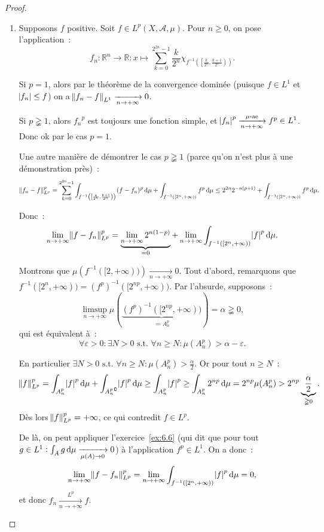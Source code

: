 \documentclass{article}
\theoremstyle{definition}
\newcommand{\pinfty}{{+\infty}}
\newcommand{\st}{\text{ s.t. }}
\newcommand{\C}{\complement}
\newcommand{\R}{{\mathbb R}}
\begin{document}
\begin{proof}~
\begin{enumerate}
	\item Supposons $f$ positive. Soit $f \in L^p(X, \mathcal A, \mu)$. Pour $n \geq 0$, on pose l'application~:
	\[f_n : \R^n \to \R : x \mapsto \sum_{k=0}^{2^{2n}-1}\frac k{2^n}\chi_{f^{-1}\left(\left[\frac k{2^n}, \frac {k+1}{2^n}\right)\right)}.\]

	Si $p=1$, alors par le théorème de la convergence dominée (puisque $f \in L^1$ et $\abs {f_n} \leq f$) on a $\norm {f_n-f}_{L^1} \xrightarrow[n \to \pinfty]{} 0$.

	Si $p \gneqq 1$, alors ${f_n}^p$ est toujours une fonction simple, et $\abs {f_n}^p \xrightarrow[n \to \pinfty]{\mu\text{-ae}} f^p \in L^1$. Donc ok par le cas $p=1$.

	Une autre manière de démontrer le cas $p \gneqq 1$ (parce qu'on n'est plus à une démonstration près)~:
	\[\norm {f_n-f}_{L^p}^p = \sum_{k=0}^{2^{2n}-1}\int_{f^{-1}\left(\left[\frac k{2^n}, \frac {k+1}{2^n}\right)\right)}(f-f_n)^p\dif\mu + \int_{f^{-1}([2^n, \pinfty))}f^p\dif\mu
		\leq 2^{2n}2^{-n(p+1)} + \int_{f^{-1}([2^n, \pinfty))}f^p\dif\mu.\]

	Donc~:
	\[\lim_{n \to \pinfty}\norm {f-f_n}_{L^p}^p = \underbrace {\lim_{n \to \pinfty}2^{n(1-p)}}_{= 0} + \lim_{n \to \pinfty}\int_{f^{-1}([2^n, \pinfty))}\abs f^p\dif\mu.\]

	Montrons que $\mu\left(f^{-1}([2, \pinfty))\right) \xrightarrow[n \to \pinfty]{} 0$. Tout d'abord, remarquons que $f^{-1}([2^n, \pinfty)) = (f^p)^{-1}([2^{np}, \pinfty))$.
	Par l'absurde, supposons~:
	\[\limsup_{n \to \pinfty}\mu\left(\underbrace {(f^p)^{-1}([2^{np}, \pinfty))}_{\eqqcolon A_n^p}\right) = \alpha \gneqq 0,\]
	qui est équivalent à~:
	\[\forall \varepsilon > 0 : \exists N > 0 \st \forall n \geq N : \mu(A_n^p) > \alpha-\varepsilon.\]

	En particulier $\exists N > 0 \st \forall n \geq N : \mu(A_n^p) > \frac \alpha2$. Or pour tout $n \geq N$~:
	\[\norm f_{L^p}^p = \int_{A_n^p}\abs f^p\dif\mu + \int_{{A_n^p}^\C}\abs f^p\dif\mu \geq \int_{A_n^p}\abs f^p \geq \int_{A_n^p}2^{np}\dif\mu = 2^{np}\mu(A_n^p)
	> 2^{np}\underbrace {\frac \alpha2}_{\gneqq 0}.\]
	Dès lors $\norm f_{L^p}^p = \pinfty$, ce qui contredit $f \in L^p$.

	De là, on peut appliquer l'exercice~\ref{ex:6.6} (qui dit que pour tout $g \in L^1 : \int_Ag\dif\mu \xrightarrow[\mu(A) \to 0]{} 0$) à l'application
	$f^p \in L^1$. On a donc~:
	\[\lim_{n \to \pinfty}\norm {f-f_n}_{L^p}^p = \lim_{n \to \pinfty}\int_{f^{-1}([2^n, \pinfty))}\abs f^p\dif\mu = 0,\]
	et donc $f_n \xrightarrow[n \to \pinfty]{L^p} f$.


\end{enumerate}
\end{proof}
\end{document}

